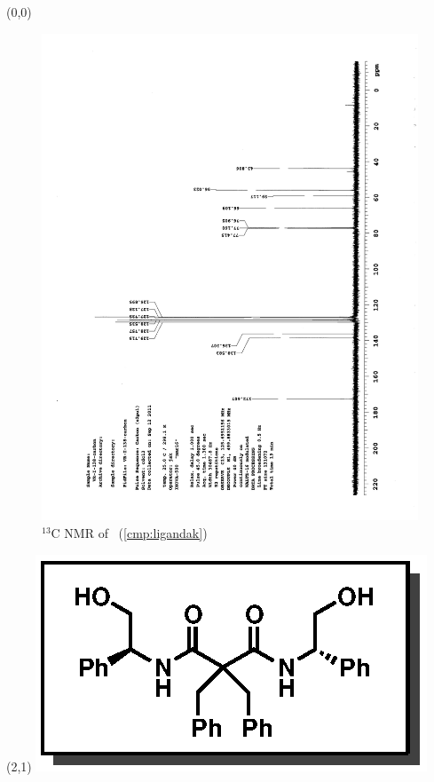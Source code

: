 \clearpage
\begin{textblock}{20}(0,0)
\begin{figure}[htb]
\caption{$^{13}$C NMR of  \CMPligandak\ (\ref{cmp:ligandak})}
\includegraphics[scale=0.75, trim = 0mm 0mm 0mm 5mm,
clip]{chp_asymmetric/images/nmr/ligandakC}
\vspace{-100pt}
\end{figure}
\end{textblock}
\begin{textblock}{1}(2,1)
\includegraphics[scale=0.8, angle=90]{chp_asymmetric/images/ligandak}
\end{textblock}
\clearpage

